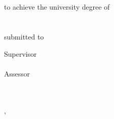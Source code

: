 
\begin{titlepage}


%

\centering
~
\vfill\vfill\vfill

\sffamily

\myauthorwithexistingtitles

\vfill

{\LARGE\bfseries\mytitle}

{\large\bfseries\mysubtitle}

\vfill\vfill\vfill\vfill

{\normalsize\bfseries\myworktitle}\\
\vfill
to achieve the university degree of\\
{\mygrade}\\
\vfill
{\mydegreeprogramme}\\
\vfill
submitted to\\
{\normalsize\bfseries\myuniversity}

\vfill\vfill\vfill
\vfill\vfill\vfill

Supervisor\\
\mysupervisor\\
\vfill
Assessor\\
\myevaluator\\
\vfill
\vfill
\myinstitute\\

\vfill

\myfaculty

\vfill\vfill\vfill

{\scriptsize\mysubmissiontown, \mysubmissionmonth~\mysubmissionyear}

\end{titlepage}

